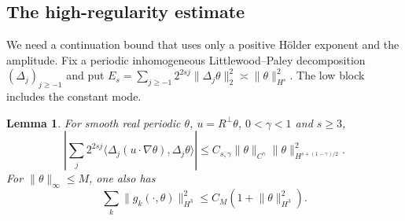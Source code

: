 \documentclass[11pt]{amsart}
\newtheorem{lemma}[theorem]{Lemma}
\theoremstyle{remark}
\numberwithin{equation}{section}
\newcommand{\norm}[1]{\lVert#1\rVert}
\begin{document}
\subsection{The high-regularity estimate}

We need a continuation bound that uses only a positive H\"older exponent and
the amplitude. Fix a periodic inhomogeneous Littlewood--Paley decomposition
$(\Delta_j)_{j\geq-1}$ and put
$E_s=\sum_{j\geq-1}2^{2sj}\norm{\Delta_j\theta}_2^2\asymp\norm{\theta}_{H^s}^2$.
The low block includes the constant mode.

\begin{lemma}\label{lem:transport}
For smooth real periodic $\theta$, $u=R^\perp\theta$, $0<\gamma<1$
and $s\geq3$,
\begin{equation}\label{eq:dyadictransport}
 \left|\sum_j2^{2sj}
  \langle\Delta_j(u\cdot\nabla\theta),\Delta_j\theta\rangle\right|
 \leq C_{s,\gamma}\norm{\theta}_{C^\gamma}
                    \norm{\theta}_{H^{s+(1-\gamma)/2}}^2.
\end{equation}
For $\norm{\theta}_\infty\leq M$, one also has
\begin{equation}\label{eq:tameH3}
 \sum_k\norm{g_k(\cdot,\theta)}_{H^3}^2
       \leq C_M(1+\norm{\theta}_{H^3}^2).
\end{equation}
\end{lemma}
\end{document}

